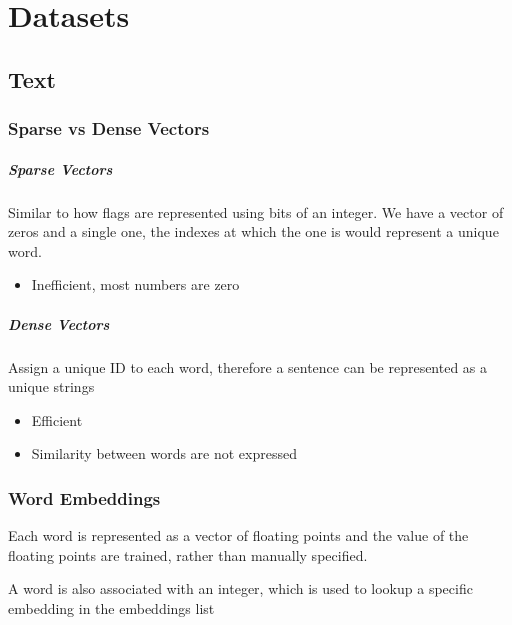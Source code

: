 \chapter{Datasets}

\section{Text}

  \subsection{Sparse vs Dense Vectors}

    \paragraph{Sparse Vectors} Similar to how flags are represented using
    bits of an integer. We have a vector of zeros and a single one,
    the indexes at which the one is would represent a unique word.
    \begin{itemize}
      \item Inefficient, most numbers are zero
    \end{itemize}

    \paragraph{Dense Vectors} Assign a unique ID to each word, therefore
    a sentence can be represented as a unique strings
    \begin{itemize}
      \item Efficient
      \item Similarity between words are not expressed
    \end{itemize}

  \subsection{Word Embeddings}

    Each word is represented as a vector of floating points and the value
    of the floating points are trained, rather than manually specified.

    A word is also associated with an integer, which is used to lookup
    a specific embedding in the embeddings list
